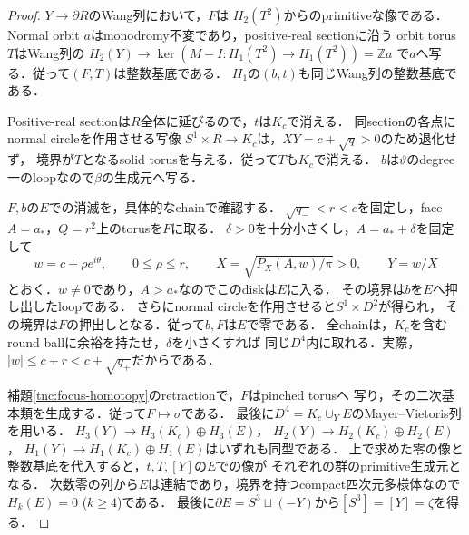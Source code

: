 \begin{proof}
$Y\to\partial R$のWang列において，$F$は
$H_2(T^2)$からのprimitiveな像である．
Normal orbit $a$はmonodromy不変であり，positive-real sectionに沿う
orbit torus $T$はWang列の
$H_2(Y)\to\ker(M-I:H_1(T^2)\to H_1(T^2))=\mathbb Z a$
で$a$へ写る．従って$(F,T)$は整数基底である．
$H_1$の$(b,t)$も同じWang列の整数基底である．

Positive-real sectionは$R$全体に延びるので，$t$は$K_c$で消える．
同sectionの各点にnormal circleを作用させる写像
$S^1\times R\to K_c$は，$XY=c+\sqrt q>0$のため退化せず，
境界が$T$となるsolid torusを与える．従って$T$も$K_c$で消える．
$b$は$\vartheta$のdegree一のloopなので$\beta$の生成元へ写る．

$F,b$の$E$での消滅を，具体的なchainで確認する．
$\sqrt{q_-}<r<c$を固定し，face $A=a_*$，$Q=r^2$上のtorusを$F$に取る．
$\delta>0$を十分小さくし，$A=a_*+\delta$を固定して
\[
 w=c+\rho e^{i\theta},\qquad 0\le\rho\le r,
 \qquad
 X=\sqrt{P_X(A,w)/\pi}>0,\qquad Y=w/X
\]
とおく．$w\ne0$であり，$A>a_*$なのでこのdiskは$E$に入る．
その境界は$b$を$E$へ押し出したloopである．
さらにnormal circleを作用させると$S^1\times D^2$が得られ，
その境界は$F$の押出しとなる．従って$b,F$は$E$で零である．
全chainは，$K_c$を含むround ballに余裕を持たせ，$\delta$を小さくすれば
同じ$D^4$内に取れる．実際，$|w|\le c+r<c+\sqrt{q_+}$だからである．

補題\ref{tnc:focus-homotopy}のretractionで，$F$はpinched torusへ
写り，その二次基本類を生成する．従って$F\mapsto\sigma$である．
最後に$D^4=K_c\cup_Y E$のMayer--Vietoris列を用いる．
$H_3(Y)\to H_3(K_c)\oplus H_3(E)$，
$H_2(Y)\to H_2(K_c)\oplus H_2(E)$，
$H_1(Y)\to H_1(K_c)\oplus H_1(E)$はいずれも同型である．
上で求めた零の像と整数基底を代入すると，$t,T,[Y]$の$E$での像が
それぞれの群のprimitive生成元となる．
次数零の列から$E$は連結であり，境界を持つcompact四次元多様体なので
$H_k(E)=0$ ($k\ge4$)である．
最後に$\partial E=S^3\sqcup(-Y)$から$[S^3]=[Y]=\zeta$を得る．
\end{proof}

